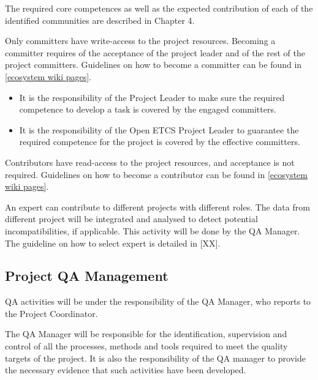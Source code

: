 \documentclass{template/openetcs_article}
\begin{document}
The required core competences as well as the expected contribution of each of the identified communities are described in Chapter 4.

Only committers have write-access to the project resources. Becoming a committer requires of the acceptance of the project leader and of the rest of the project committers. Guidelines on how to become a committer can be found in \href{https://github.com/openETCS/ecosystem/wiki/_pages}{[ecosystem wiki pages]}.

\begin{itemize}
\item It is the responsibility of the Project Leader to make sure the required competence to develop a task is covered by the engaged committers.
\item It is the responsibility of the Open ETCS Project Leader to guarantee the required competence for the project is covered by the effective committers.
\end{itemize}

Contributors have read-access to the project resources, and acceptance is not required. Guidelines on how to become a contributor can be found in \href{https://github.com/openETCS/ecosystem/wiki/_pages}{[ecosystem wiki pages]}.

An expert can contribute to different projects with different roles. The data from different project will be integrated and analysed to detect potential incompatibilities, if applicable. This activity will be done by the QA Manager. The guideline on how to select expert is detailed in [XX].


\subsection{Project QA Management}
QA activities will be under the responsibility of the QA Manager, who reports to the Project Coordinator.

The QA Manager will be responsible for the identification, supervision and control of all the processes, methods and tools required to meet the quality targets of the project. It is also the responsibility of the QA manager to provide the necessary evidence that such activities have been developed.
\end{document}
